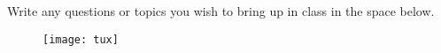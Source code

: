 \documentclass[letterpaper,12pt]{exam}
\begin{document}
Write any questions or topics you wish to bring up in class in the space below.
\begin{figure}[b]\label{end}
	\center
	\texttt{[image: tux]}
	{}
\end{figure}
\end{document}
